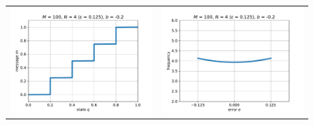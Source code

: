 \documentclass[12pt]{article}
\begin{document}
\begin{figure}[h]
\begin{center}
\begin{tabular}{cc}
			\includegraphics[scale=.5]{msg5} & \includegraphics[scale=.5]{err5} 
		\end{tabular}
	\end{center}
\end{figure}

\end{document}
